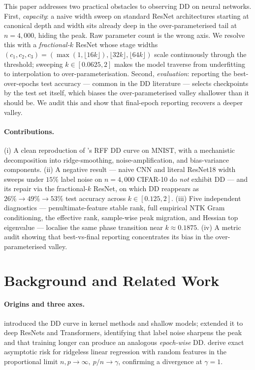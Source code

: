 \documentclass{article}
\begin{document}
This paper addresses two practical obstacles to observing DD on neural networks. First, \emph{capacity}: a naive width sweep on standard ResNet architectures starting at canonical depth and width sits already deep in the over-parameterised tail at $n=4{,}000$, hiding the peak. Raw parameter count is the wrong axis. We resolve this with a \emph{fractional-$k$} ResNet whose stage widths $(c_1,c_2,c_3) = (\max(1,\lfloor 16k\rfloor), \lfloor 32k\rfloor, \lfloor 64k\rfloor)$ scale continuously through the threshold; sweeping $k\in[0.0625,2]$ makes the model traverse from underfitting to interpolation to over-parameterisation. Second, \emph{evaluation}: reporting the best-over-epochs test accuracy --- common in the DD literature --- selects checkpoints by the test set itself, which biases the over-parameterised valley shallower than it should be. We audit this and show that final-epoch reporting recovers a deeper valley.

\paragraph{Contributions.} (i) A clean reproduction of \citet{belkin2019reconciling}'s RFF DD curve on MNIST, with a mechanistic decomposition into ridge-smoothing, noise-amplification, and bias-variance components. (ii) A negative result --- naive CNN and literal ResNet18 width sweeps under $15\%$ label noise on $n=4{,}000$ CIFAR-10 do \emph{not} exhibit DD --- and its repair via the fractional-$k$ ResNet, on which DD reappears as $26\%\!\to\!49\%\!\to\!53\%$ test accuracy across $k\in[0.125,2]$. (iii) Five independent diagnostics --- penultimate-feature stable rank, full empirical NTK Gram conditioning, the \citet{bartlett2020benign} effective rank, sample-wise peak migration, and Hessian top eigenvalue --- localise the same phase transition near $k\approx0.1875$. (iv) A metric audit showing that best-vs-final reporting concentrates its bias in the over-parameterised valley.

\section{Background and Related Work}
\label{sec:background}

\paragraph{Origins and three axes.} \citet{belkin2019reconciling} introduced the DD curve in kernel methods and shallow models; \citet{nakkiran2021deep} extended it to deep ResNets and Transformers, identifying that label noise sharpens the peak and that training longer can produce an analogous \emph{epoch-wise} DD. \citet{hastie2022surprises} derive exact asymptotic risk for ridgeless linear regression with random features in the proportional limit $n,p\to\infty,\ p/n\to\gamma$, confirming a divergence at $\gamma=1$.
\end{document}
